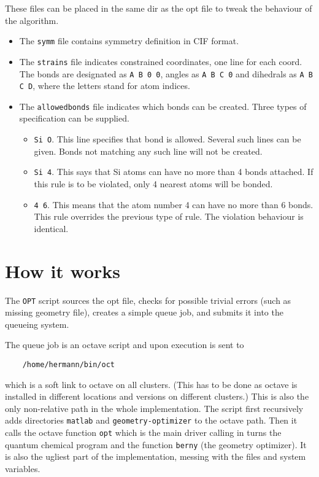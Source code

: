 \documentclass[12pt,a4]{article}
\newcommand{\ttt}{\texttt}
\begin{document}
These files can be placed in the same dir as the opt file to tweak the behaviour of the algorithm.
\begin{itemize}
\item The \ttt{symm} file contains symmetry definition in CIF format.
\item The \ttt{strains} file indicates constrained coordinates, one line for each coord. The bonds are designated as \ttt{A B 0 0}, angles as \ttt{A B C 0} and dihedrals as \ttt{A B C D}, where the letters stand for atom indices. 
\item The \ttt{allowedbonds} file indicates which bonds can be created. Three types of specification can be supplied.
\begin{itemize}
\item \ttt{Si O}. This line specifies that  bond is allowed. Several such lines can be given. Bonds not matching any such line will not be created.
\item \ttt{Si 4}. This says that Si atoms can have no more than 4 bonds attached. If this rule is to be violated, only 4 nearest atoms will be bonded.
\item \ttt{4 6}. This means that the atom number 4 can have no more than 6 bonds. This rule overrides the previous type of rule. The violation behaviour is identical.
\end{itemize}
\end{itemize}

\section{How it works}

The \ttt{OPT} script sources the opt file, checks for possible trivial errors (such as missing geometry file), creates a simple queue job, and submits it into the queueing system.

The queue job is an octave script and upon execution is sent to
\begin{verbatim}
	/home/hermann/bin/oct
\end{verbatim}
which is a soft link to octave on all clusters. (This has to be done as octave is installed in different locations and versions on different clusters.) This is also the only non-relative path in the whole implementation. The script first recursively adds directories \ttt{matlab} and \ttt{geometry-optimizer} to the octave path. Then it calls the octave function \ttt{opt} which is the main driver calling in turns the quantum chemical program and the function \ttt{berny} (the geometry optimizer). It is also the ugliest part of the implementation, messing with the files and system variables.
\end{document}
